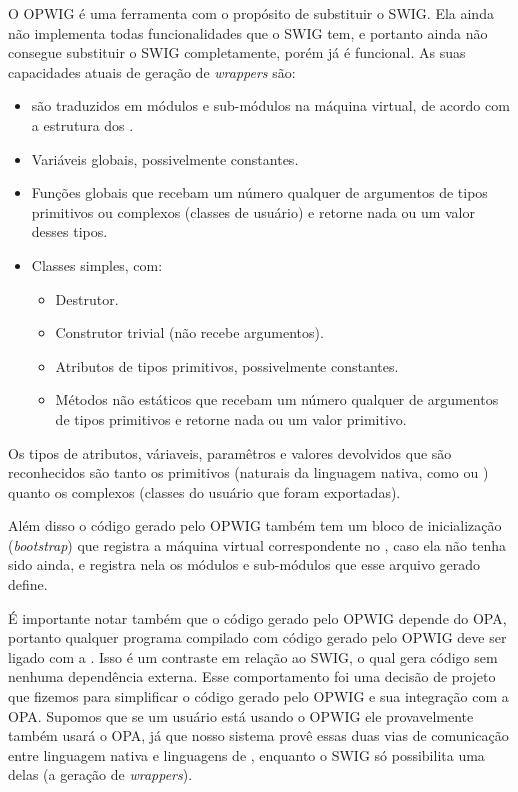 O OPWIG é uma ferramenta com o propósito de substituir o SWIG.
Ela ainda não implementa todas funcionalidades que o SWIG tem, e portanto
ainda não consegue substituir o SWIG completamente, porém já é funcional.
As suas capacidades atuais de geração de \textit{wrappers} são:
\begin{itemize}
  \item {} são traduzidos em módulos e sub-módulos na máquina
    virtual, de acordo com a estrutura dos .
  \item Variáveis globais, possivelmente constantes.
  \item Funções globais que recebam um número qualquer de argumentos de tipos
    primitivos ou complexos (classes de usuário) e retorne nada ou um valor desses tipos.
  \item Classes simples, com:
    \begin{itemize}
      \item Destrutor.
      \item Construtor trivial (não recebe argumentos).
      \item Atributos de tipos primitivos, possivelmente constantes.
      \item Métodos não estáticos que recebam um número qualquer de argumentos
        de tipos primitivos e retorne nada ou um valor primitivo.
    \end{itemize}
\end{itemize}
Os tipos de atributos, váriaveis, paramêtros e valores devolvidos que são reconhecidos
são tanto os primitivos (naturais da linguagem nativa, como  ou )
quanto os complexos (classes do usuário que foram exportadas).

Além disso o código gerado pelo OPWIG também tem um bloco de inicialização
(\textit{bootstrap}) que registra a máquina virtual correspondente no \SMgr{},
caso ela não tenha sido ainda, e registra nela os módulos e sub-módulos que esse
arquivo gerado define.

É importante notar também que o código gerado pelo OPWIG depende do OPA, 
portanto qualquer programa compilado com código gerado pelo OPWIG deve ser
ligado com a . Isso é um contraste em relação ao SWIG, o qual gera
código sem nenhuma dependência externa. Esse comportamento foi uma decisão de
projeto que fizemos para simplificar o código gerado pelo OPWIG e sua integração
com a OPA. Supomos que se um usuário está usando o OPWIG ele provavelmente
também usará o OPA, já que nosso sistema provê essas duas vias de comunicação
entre linguagem nativa e linguagens de \script{}, enquanto o SWIG só possibilita
uma delas (a geração de \textit{wrappers}).

